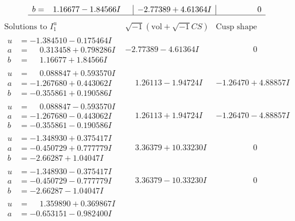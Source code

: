 \documentclass[1p]{elsarticle_modified}
\theoremstyle{definition}
\newcommand{\I}{\sqrt{-1}}
\begin{document}
$$\begin{array}{c|c|c}
\begin{aligned}
b &= \phantom{-}1.16677 - 1.84566 I\end{aligned}
 & -2.77389 + 4.61364 I & \phantom{-0.000000 } 0\\
 \hline 
 \end{array}$$\newpage$$\begin{array}{c|c|c}  
\text{Solutions to }I^u_{1}& \I (\text{vol} + \sqrt{-1}CS) & \text{Cusp shape}\\
 \hline 
\begin{aligned}
u &= -1.384510 - 0.175464 I \\
a &= \phantom{-}0.313458 + 0.798286 I \\
b &= \phantom{-}1.16677 + 1.84566 I\end{aligned}
 & -2.77389 - 4.61364 I & \phantom{-0.000000 } 0 \\ \hline\begin{aligned}
u &= \phantom{-}0.088847 + 0.593570 I \\
a &= -1.267680 + 0.443062 I \\
b &= -0.355861 + 0.190586 I\end{aligned}
 & \phantom{-}1.26113 - 1.94724 I & -1.26470 + 4.88857 I \\ \hline\begin{aligned}
u &= \phantom{-}0.088847 - 0.593570 I \\
a &= -1.267680 - 0.443062 I \\
b &= -0.355861 - 0.190586 I\end{aligned}
 & \phantom{-}1.26113 + 1.94724 I & -1.26470 - 4.88857 I \\ \hline\begin{aligned}
u &= -1.348930 + 0.375417 I \\
a &= -0.450729 + 0.777779 I \\
b &= -2.66287 + 1.04047 I\end{aligned}
 & \phantom{-}3.36379 + 10.33230 I & \phantom{-0.000000 } 0 \\ \hline\begin{aligned}
u &= -1.348930 - 0.375417 I \\
a &= -0.450729 - 0.777779 I \\
b &= -2.66287 - 1.04047 I\end{aligned}
 & \phantom{-}3.36379 - 10.33230 I & \phantom{-0.000000 } 0 \\ \hline\begin{aligned}
u &= \phantom{-}1.359890 + 0.369867 I \\
a &= -0.653151 - 0.982400 I \\

\end{aligned}
\end{array}$$
\end{document}

